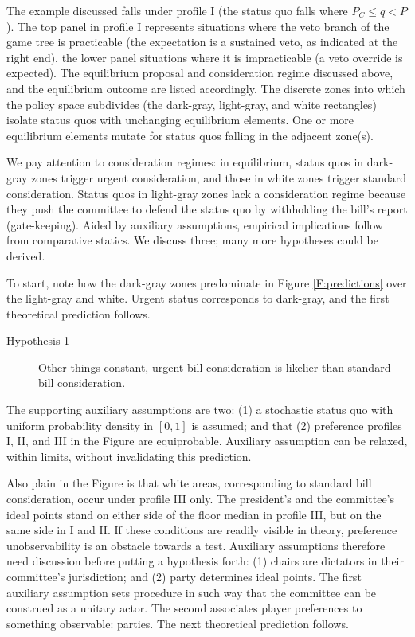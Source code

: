 \documentclass[letter,12pt]{article}
\begin{document}
The example discussed falls under profile I (the status quo falls where $P_C \leq q < P$). The top panel in profile I represents situations where the veto branch of the game tree is practicable (the expectation is a sustained veto, as indicated at the right end), the lower panel situations where it is impracticable (a veto override is expected). The equilibrium proposal and consideration regime discussed above, and the equilibrium outcome are listed accordingly. The discrete zones into which the policy space subdivides (the dark-gray, light-gray, and white rectangles) isolate status quos with unchanging equilibrium elements. One or more equilibrium elements mutate for status quos falling in the adjacent zone(s).

We pay attention to consideration regimes: in equilibrium, status quos in dark-gray zones trigger urgent consideration, and those in white zones trigger standard consideration. Status quos in light-gray zones lack a consideration regime because they push the committee to defend the status quo by withholding the bill's report (gate-keeping). Aided by auxiliary assumptions, empirical implications follow from comparative statics. We discuss three; many more hypotheses could be derived.

To start, note how the dark-gray zones predominate in Figure \ref{F:predictions} over the light-gray and white. Urgent status corresponds to dark-gray, and the first theoretical prediction follows.

\begin{description}
  \item [Hypothesis 1] Other things constant, urgent bill consideration is likelier than standard bill consideration. 
\end{description}
    
\noindent The supporting auxiliary assumptions are two: (1) a stochastic status quo with uniform probability density in $[0,1]$ is assumed; and that (2) preference profiles I, II, and III in the Figure are equiprobable. Auxiliary assumption can be relaxed, within limits, without invalidating this prediction. 

Also plain in the Figure is that white areas, corresponding to standard bill consideration, occur under profile III only. The president's and the committee's ideal points stand on either side of the floor median in profile III, but on the same side in I and II. If these conditions are readily visible in theory, preference unobservability is an obstacle towards a test. Auxiliary assumptions therefore need discussion before putting a hypothesis forth: (1) chairs are dictators in their committee's jurisdiction; and (2) party determines ideal points. The first auxiliary assumption sets procedure in such way that the committee can be construed as a unitary actor. The second associates player preferences to something observable: parties. The next theoretical prediction follows. 
\end{document}
